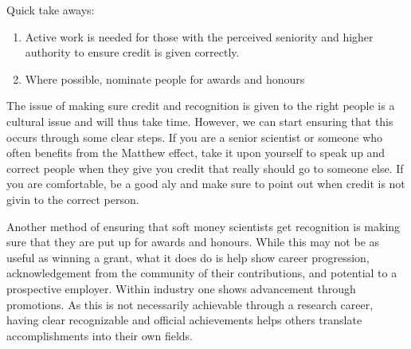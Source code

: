 \documentclass[letterpaper, 12pt]{article}
\begin{document}
\begin{tcolorbox}[enhanced,width=\textwidth,center upper,
    fontupper=\bfseries,sharp corners, colback=CASIIlightgrey, colframe=CASIIdarkgreen]
\textcolor{CASIIorange}{Quick take aways:}
\begin{enumerate}
    \item \textcolor{CASIIdarkindago}{ Active work is needed for those with the perceived seniority and higher authority to ensure credit is given correctly.  }
    \item \textcolor{CASIIdarkindago}{ Where possible, nominate people for awards and honours}


\end{enumerate}
\end{tcolorbox}

The issue of making sure credit and recognition is given to the right people is a cultural issue and will thus take time. However, we can start ensuring that this occurs through some clear steps. If you are a senior scientist or someone who often benefits from the Matthew effect, take it upon yourself to speak up and correct people when they give you credit that really should go to someone else. If you are comfortable, be a good aly and make sure to point out when credit is not givin to the correct person. 

Another method of ensuring that soft money scientists get recognition is making sure that they are put up for awards and honours. While this may not be as useful as winning a grant, what it does do is help show career progression, acknowledgement from the community of their contributions, and potential to a prospective employer. Within industry one shows advancement through promotions. As this is not necessarily achievable through a research career, having clear recognizable and official achievements helps others translate accomplishments into their own fields. 
\end{document}
